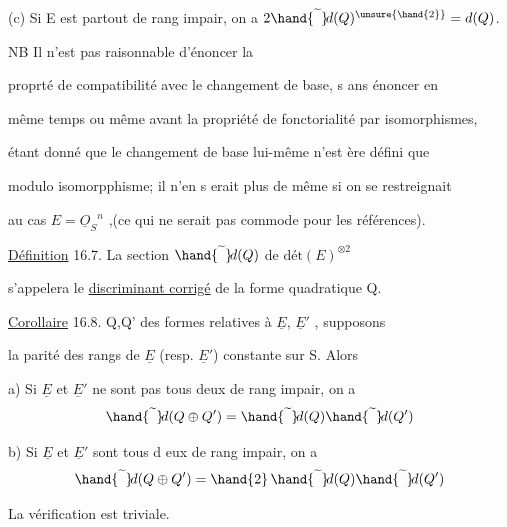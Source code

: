 
(c) Si E est partout de rang impair, on a $2\hand{\widetilde{\phantom{d}}}\!d(Q)^{\unsure{\hand{2}}} = d(Q)$.


 \quad NB Il n'est pas raisonnable d'énoncer la

proprté de compatibilité avec le changement de base, s ans énoncer en

même temps\hand{,} ou même avant\hand{,} la propriété de fonctorialité par isomorphismes,

étant donné que le changement de base  lui-même n'est ère défini que

modulo isomorpphisme; il n'en s erait plus de même si on se restreignait

au cas $E = \underline{O}_S{}^n$ ,(ce qui ne serait pas commode pour les références).

 \quad \uline{Définition} 16.7. La section $\hand{\widetilde{\phantom{d}}}\!d(Q)$ de $\text{dét}(E)^{\otimes 2}$

s'appelera le \uline{discriminant corrigé} de la forme quadratique Q.

\uline{Corollaire} 16.8.  Q,Q' des formes relatives à $\underline{E}$, $\underline{E}'$ , supposons

la parité des rangs de $\underline{E}$ (resp. $\underline{E}'$) constante sur S. Alors

a) Si $\underline{E}$ et $\underline{E}'$ ne sont pas tous deux de rang impair, on a
\[ \hand{\widetilde{\phantom{d}}}\!d(Q \oplus Q') = \hand{\widetilde{\phantom{d}}}\!d(Q)\hand{\widetilde{\phantom{d}}}\!d(Q') \]

b) Si $\underline{E}$ et $\underline{E}'$ sont tous d eux de rang impair, on a
\[ \hand{\widetilde{\phantom{d}}}\!d(Q \oplus Q') = \hand{2}\,\hand{\widetilde{\phantom{d}}}\!d(Q)\hand{\widetilde{\phantom{d}}}\!d(Q') \]

La vérification est triviale.

